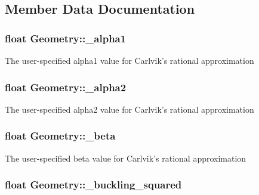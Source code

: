 \subsection{Member Data Documentation}
\hypertarget{classGeometry_a29007358759f00d89a8544539bfb7b75}{
\subsubsection[{\-\_\-alpha1}]{\setlength{\rightskip}{0pt plus 5cm}float Geometry\-::\-\_\-alpha1\hspace{0.3cm}{\ttfamily [private]}}}\label{classGeometry_a29007358759f00d89a8544539bfb7b75}
The user-\/specified alpha1 value for Carlvik's rational approximation \hypertarget{classGeometry_a36642c1914426a3bdbcb291497e2c7f8}{
\subsubsection[{\-\_\-alpha2}]{\setlength{\rightskip}{0pt plus 5cm}float Geometry\-::\-\_\-alpha2\hspace{0.3cm}{\ttfamily [private]}}}\label{classGeometry_a36642c1914426a3bdbcb291497e2c7f8}
The user-\/specified alpha2 value for Carlvik's rational approximation \hypertarget{classGeometry_a20733d493193d7c75ad9afb454046324}{
\subsubsection[{\-\_\-beta}]{\setlength{\rightskip}{0pt plus 5cm}float Geometry\-::\-\_\-beta\hspace{0.3cm}{\ttfamily [private]}}}\label{classGeometry_a20733d493193d7c75ad9afb454046324}
The user-\/specified beta value for Carlvik's rational approximation \hypertarget{classGeometry_aa4c62b0931b1a51effdec42a28e9088f}{
\subsubsection[{\-\_\-buckling\-\_\-squared}]{\setlength{\rightskip}{0pt plus 5cm}float Geometry\-::\-\_\-buckling\-\_\-squared\hspace{0.3cm}{\ttfamily [private]}}}\label{classGeometry_aa4c62b0931b1a51effdec42a28e9088f}
